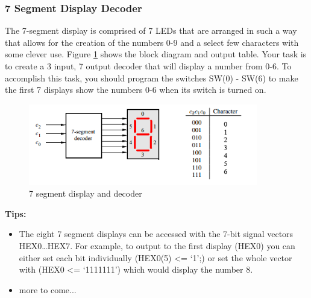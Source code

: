 \subsubsection{7 Segment Display Decoder}

The 7-segment display is comprised of 7 LEDs that are arranged in such a way that allows for the creation of the numbers 0-9 and a select few characters with some clever use. Figure \ref{fig:7seg} shows the block diagram and output table. Your task is to create a 3 input, 7 output decoder that will display a number from 0-6. To accomplish this task, you should program the switches SW(0) - SW(6) to make the first 7 displays show the numbers 0-6 when its switch is turned on.

\begin{figure}[H]
	\centering
	\includegraphics[width=100mm]{Lab1/figures/7seg.png}
	\caption{7 segment display and decoder}
	\label{fig:7seg}
\end{figure}

{\bf Tips:} 
\begin{itemize}
  \item The eight 7 segment displays can be accessed with the 7-bit signal vectors HEX0\ldots HEX7. For example, to output to the first display (HEX0) you can either set each bit individually (HEX0(5) <= `1';) or set the whole vector with (HEX0 <= `1111111') which would display the number 8. 
\item more to come...
\end{itemize}